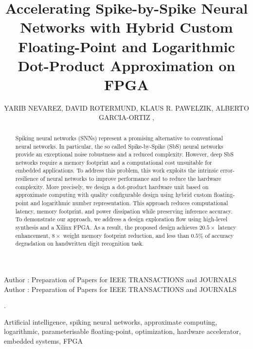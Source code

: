 \title {Accelerating Spike-by-Spike Neural Networks with Hybrid Custom Floating-Point and Logarithmic Dot-Product Approximation on FPGA}

\author{
	\uppercase{Yarib Nevarez},	
	\uppercase{David Rotermund},
	\uppercase{Klaus R. Pawelzik},
	\uppercase{Alberto Garcia-Ortiz} ,
}

\address[1]{Institute of Electrodynamics and Microelectronics, University of Bremen, Bremen 28359, Germany (e-mail: nevarez@item.uni-bremen.de)}

\address[2]{Institute for Theoretical Physics, University of Bremen, Bremen 28359, Germany (e-mail: davrot@@neuro.uni-bremen.de)}

\address[3]{Institute for Theoretical Physics, University of Bremen, Bremen 28359, Germany (e-mail: pawelzik@@neuro.uni-bremen.de)}

\address[4]{Institute of Electrodynamics and Microelectronics, University of Bremen, Bremen 28359, Germany (e-mail: agaracia@item.uni-bremen.de)}


\markboth
{Author \headeretal: Preparation of Papers for IEEE TRANSACTIONS and JOURNALS}
{Author \headeretal: Preparation of Papers for IEEE TRANSACTIONS and JOURNALS}

.

\begin{abstract}
  Spiking neural networks (SNNs) represent a promising alternative to
  conventional neural networks. In particular, the so called
  Spike-by-Spike (SbS) neural networks provide an exceptional noise
  robustness and a reduced complexity. However, deep SbS networks
  require a memory footprint and a computational cost unsuitable for
  embedded applications. To address this problem, this work exploits
  the intrinsic error-resilience of neural networks to improve
  performance and to reduce the hardware complexity. More precisely, we
  design a dot-product hardware unit based on approximate computing
  with quality configurable design using hybrid custom floating-point and logarithmic number representation. This approach reduces
  computational latency, memory footprint, and power dissipation while
  preserving inference accuracy. To demonstrate our approach, we address a
  design exploration flow using high-level synthesis and a Xilinx
  FPGA. As a result, the proposed design achieves $20.5\times$
  latency enhancement, $8\times$ weight memory footprint reduction,
  and less than $0.5\%$ of accuracy degradation on handwritten digit
  recognition task.
	
\end{abstract}

\begin{keywords}
Artificial intelligence, spiking neural networks, approximate computing, logarithmic, parameterisable floating-point, optimization, hardware accelerator, embedded systems, FPGA
\end{keywords}

\titlepgskip=-15pt

\maketitle
